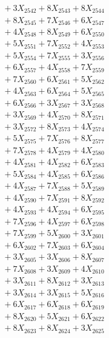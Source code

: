 \documentclass[a4paper,10pt]{article}
\begin{document}
{\begin{align}
&\;  + 3 X_{2542} + 8 X_{2543} + 8 X_{2544} \\[0.3ex]
&\;  + 8 X_{2545} + 7 X_{2546} + 6 X_{2547} \\[0.3ex]
&\;  + 4 X_{2548} + 8 X_{2549} + 6 X_{2550} \\[0.3ex]
&\;  + 5 X_{2551} + 7 X_{2552} + 4 X_{2553} \\[0.3ex]
&\;  + 5 X_{2554} + 7 X_{2555} + 3 X_{2556} \\[0.3ex]
&\;  + 6 X_{2557} + 4 X_{2558} + 7 X_{2559} \\[0.5ex]\allowbreak
&\;  + 7 X_{2560} + 6 X_{2561} + 5 X_{2562} \\[0.3ex]
&\;  + 4 X_{2563} + 6 X_{2564} + 5 X_{2565} \\[0.3ex]
&\;  + 6 X_{2566} + 3 X_{2567} + 3 X_{2568} \\[0.3ex]
&\;  + 3 X_{2569} + 4 X_{2570} + 8 X_{2571} \\[0.3ex]
&\;  + 3 X_{2572} + 8 X_{2573} + 4 X_{2574} \\[0.3ex]
&\;  + 5 X_{2575} + 7 X_{2576} + 8 X_{2577} \\[0.3ex]
&\;  + 7 X_{2578} + 4 X_{2579} + 4 X_{2580} \\[0.3ex]
&\;  + 4 X_{2581} + 4 X_{2582} + 6 X_{2583} \\[0.3ex]
&\;  + 5 X_{2584} + 4 X_{2585} + 6 X_{2586} \\[0.3ex]
&\;  + 4 X_{2587} + 7 X_{2588} + 5 X_{2589} \\[0.5ex]\allowbreak
&\;  + 4 X_{2590} + 7 X_{2591} + 8 X_{2592} \\[0.3ex]
&\;  + 4 X_{2593} + 4 X_{2594} + 6 X_{2595} \\[0.3ex]
&\;  + 7 X_{2596} + 4 X_{2597} + 6 X_{2598} \\[0.3ex]
&\;  + 7 X_{2599} + 5 X_{2600} + 3 X_{2601} \\[0.3ex]
&\;  + 6 X_{2602} + 7 X_{2603} + 6 X_{2604} \\[0.3ex]
&\;  + 3 X_{2605} + 3 X_{2606} + 8 X_{2607} \\[0.3ex]
&\;  + 7 X_{2608} + 3 X_{2609} + 4 X_{2610} \\[0.3ex]
&\;  + 3 X_{2611} + 8 X_{2612} + 3 X_{2613} \\[0.3ex]
&\;  + 3 X_{2614} + 3 X_{2615} + 5 X_{2616} \\[0.3ex]
&\;  + 6 X_{2617} + 6 X_{2618} + 6 X_{2619} \\[0.5ex]\allowbreak
&\;  + 8 X_{2620} + 5 X_{2621} + 6 X_{2622} \\[0.3ex]
&\;  + 8 X_{2623} + 8 X_{2624} + 3 X_{2625} \\[0.3ex]

\end{align}}
\end{document}
